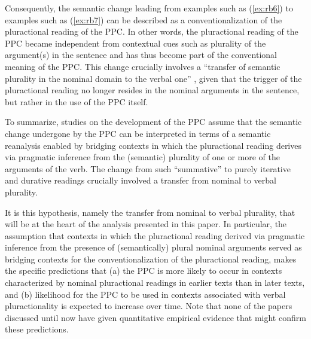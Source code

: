 \documentclass[output=paper,colorlinks,citecolor=brown]{langscibook}
\begin{document}
Consequently, the semantic change leading from examples such as (\ref{ex:rb6}) to examples such as (\ref{ex:rb7}) can be described as a conventionalization of the pluractional reading of the PPC. In other words, the pluractional reading of the PPC became independent from contextual cues such as plurality of the argument(s) in the sentence and has thus become part of the conventional meaning of the PPC. This change crucially involves a “transfer of semantic plurality in the nominal domain to the verbal one” \parencite[51]{AmaralHowe2012}, given that the trigger of the pluractional reading no longer resides in the nominal arguments in the sentence, but rather in the use of the PPC itself.

To summarize, studies on the development of the PPC assume that the semantic change undergone by the PPC can be interpreted in terms of a semantic reanalysis enabled by bridging contexts in which the pluractional reading derives via pragmatic inference from the (semantic) plurality of one or more of the arguments of the verb. The change from such “summative” to purely iterative and durative readings crucially involved a transfer from nominal to verbal plurality.

It is this hypothesis, namely the transfer from nominal to verbal plurality, that will be at the heart of the analysis presented in this paper. In particular, the assumption that contexts in which the pluractional reading derived via pragmatic inference from the presence of (semantically) plural nominal arguments served as bridging contexts for the conventionalization of the pluractional reading, makes the specific predictions that (a) the PPC is more likely to occur in contexts characterized by nominal pluractional readings in earlier texts than in later texts, and (b) likelihood for the PPC to be used in contexts associated with verbal pluractionality is expected to increase over time. Note that none of the papers discussed until now have given quantitative empirical evidence that might confirm these predictions.\largerpage
\end{document}
